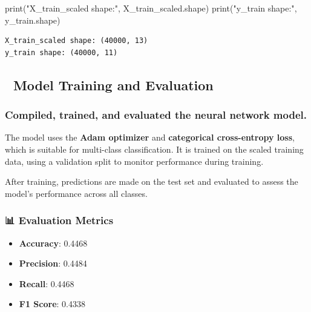 \documentclass[
  letterpaper,
  DIV=11,
  numbers=noendperiod]{scrartcl}
\newenvironment{Shaded}{\begin{snugshade}}{\end{snugshade}}
\newcommand{\BuiltInTok}[1]{\textcolor[rgb]{0.00,0.23,0.31}{#1}}
\newcommand{\NormalTok}[1]{\textcolor[rgb]{0.00,0.23,0.31}{#1}}
\newcommand{\StringTok}[1]{\textcolor[rgb]{0.13,0.47,0.30}{#1}}
\providecommand{\tightlist}{%
  \setlength{\itemsep}{0pt}\setlength{\parskip}{0pt}}
\begin{document}
\begin{Shaded}
\begin{Highlighting}[]
\BuiltInTok{print}\NormalTok{(}\StringTok{"X\_train\_scaled shape:"}\NormalTok{, X\_train\_scaled.shape)}
\BuiltInTok{print}\NormalTok{(}\StringTok{"y\_train shape:"}\NormalTok{, y\_train.shape)}
\end{Highlighting}
\end{Shaded}

\begin{verbatim}
X_train_scaled shape: (40000, 13)
y_train shape: (40000, 11)
\end{verbatim}

\subsection{🧠 Model Training and
Evaluation}\label{model-training-and-evaluation}

\subsubsection{Compiled, trained, and evaluated the neural network
model.}\label{compiled-trained-and-evaluated-the-neural-network-model.}

The model uses the \textbf{Adam optimizer} and \textbf{categorical
cross-entropy loss}, which is suitable for multi-class classification.
It is trained on the scaled training data, using a validation split to
monitor performance during training.

After training, predictions are made on the test set and evaluated to
assess the model's performance across all classes.

\subsubsection{📊 Evaluation Metrics}\label{evaluation-metrics}

\begin{itemize}
\tightlist
\item
  \textbf{Accuracy}: 0.4468
\item
  \textbf{Precision}: 0.4484
\item
  \textbf{Recall}: 0.4468
\item
  \textbf{F1 Score}: 0.4338
\end{itemize}
\end{document}
